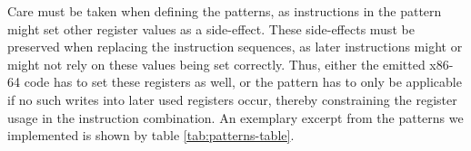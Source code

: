 Care must be taken when defining the patterns, as instructions in the pattern might set other register values as a side-effect.
These side-effects must be preserved when replacing the instruction sequences, as later instructions might or might not rely on these values being set correctly.
Thus, either the emitted x86-64 code has to set these registers as well, or the pattern has to only be applicable if no such writes into later used registers occur, thereby constraining the register usage in the instruction combination.
An exemplary excerpt from the patterns we implemented is shown by table \ref{tab:patterns-table}.

\begin{table*}[t]
	\centering
	\ttfamily
	\small
	\caption[Patterns used for macro-op-fusion]%
	{Some examples of patterns currently fused by the translator, the last five taken from rv8~\cite{clark2017rv8}.}
	\label{tab:patterns-table}
\end{table*}















